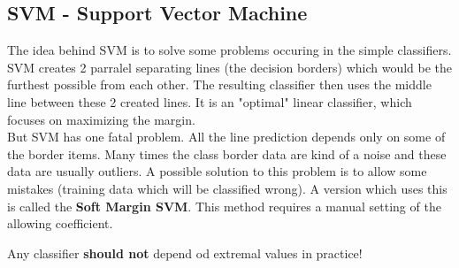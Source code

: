 \subsection{SVM - Support Vector Machine}
The idea behind SVM is to solve some problems occuring in the simple classifiers. SVM creates 2 parralel separating lines (the decision borders) which would be the furthest possible from each other. The resulting classifier then uses the middle line between these 2 created lines. It is an "optimal" linear classifier, which focuses on maximizing the margin.\\
But SVM has one fatal problem. All the line prediction depends only on some of the border items. Many times the class border data are kind of a noise and these data are usually outliers. A possible solution to this problem is to allow some mistakes (training data which will be classified wrong). A version which uses this is called the \textbf{Soft Margin SVM}. This method requires a manual setting of the allowing coefficient.

\begin{remark}
	Any classifier \textbf{should not} depend od extremal values in practice!
\end{remark}

